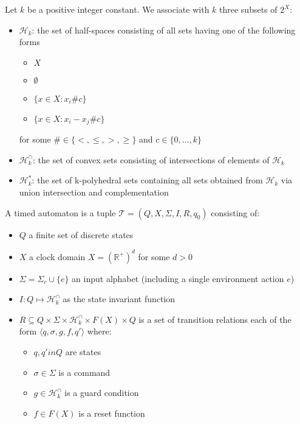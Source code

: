 \documentclass[table]{beamer}
\begin{document}
\begin{frame}
	\begin{dfn}
		Let $k$ be a positive integer constant. We associate with $k$ three subsets of $2^X$:
		\begin{itemize}
			\item $\mathcal{H}_k$: the set of half-spaces consisting of all sets having one of the following forms
				\begin{itemize}
					\item $X$
					\item $\emptyset$
					\item $\{x \in X:x_i \# c\}$
					\item $\{x \in X:x_i-x_j \# c\}$
				\end{itemize}
				for some $\# \in \{<,\leq,>,\geq\}$ and $c \in \{0,\ldots,k\}$
			\item $\mathcal{H}^\cap_k$: the set of convex sets consisting of intersections of elements of $\mathcal{H}_k$
			\item $\mathcal{H}^*_k$: the set of k-polyhedral sets containing all sets obtained from $\mathcal{H}_k$ via union intersection and complementation
		\end{itemize}
	\end{dfn}
\end{frame}

\begin{frame}
	\begin{dfn}
		A timed automaton is a tuple $\mathcal{T}=\left( Q,X,\Sigma,I,R,q_0\right)$ consisting of:
		\begin{itemize}
			\item $Q$ a finite set of discrete states
			\item $X$ a clock domain $X=(\mathbb{R}^+)^d$ for some $d>0$
			\item $\Sigma=\Sigma_c \cup \{e\}$ an input alphabet (including a single environment action $e$)
			\item $I:Q \mapsto \mathcal{H}^\cap_k$ as the state invariant function
			\item $R \subseteq Q \times \Sigma \times \mathcal{H}^\cap_k \times F(X) \times Q$ is
			 a set of transition relations each of the form $\langle q,\sigma,g,f,q'\rangle$ where:
			\begin{itemize}
				\item $q,q' in Q$ are states
				\item $\sigma \in \Sigma$ is a command
				\item $g \in \mathcal{H}^\cap_k$ is a guard condition
				\item $f \in F(X)$ is a reset function
			\end{itemize}
		\end{itemize}
	\end{dfn}\cite{alur1999timed}
\end{frame}
\end{document}
